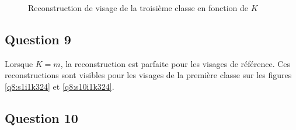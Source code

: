 \documentclass[a4paper]{article}
\begin{document}
\begin{figure}[!ht]
  \hspace{0.001\textwidth}
  \hspace{0.001\textwidth}
  \hspace{0.001\textwidth}
  \hspace{0.001\textwidth}
  \hspace{0.001\textwidth}
  \caption{Reconstruction de visage de la troisième classe en fonction de $K$}
  \label{q8c3}
\end{figure}

\subsection{Question 9}

Lorsque $K=m$, la reconstruction est parfaite pour les visages de référence. Ces reconstructions sont visibles
pour les visages de la première classe sur les figures \ref{q8:s1i1k324} et \ref{q8:s10i1k324}.

\subsection{Question 10}
\end{document}
